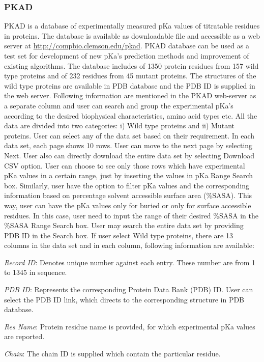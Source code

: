 \documentclass[9pt,tutorial,pubversion]{livecoms}
\begin{document}
\subsubsection{PKAD}
PKAD is a database of experimentally measured pKa values of titratable residues in proteins. The database\cite{pahari2019pkad} is available as downloadable file and accessible as a web server at \url{http://compbio.clemson.edu/pkad}. PKAD database can be used as a test set for development of new pKa’s prediction methods and improvement of existing algorithms. The database includes of 1350 protein residues from 157 wild type proteins and of 232 residues from 45 mutant proteins. The structures of the wild type proteins are available in PDB database and the PDB ID is supplied in the web server. Following information are mentioned in the PKAD web-server as a separate column and user can search and group the experimental pKa’s according to the desired biophysical characteristics, amino acid types etc. All the data are divided into two categories: i) Wild type proteins and ii) Mutant proteins. User can select any of the data set based on their requirement. In each data set, each page shows 10 rows. User can move to the next page by selecting Next. User also can directly download the entire data set by selecting Download CSV option. User can choose to see only those rows which have experimental pKa values in a certain range, just by inserting the values in pKa Range Search box. Similarly, user have the option to filter pKa values and the corresponding information based on percentage solvent accessible surface area (\%SASA). This way, user can have the pKa values only for buried or only for surface accessible residues. In this case, user need to input the range of their desired \%SASA in the \%SASA Range Search box. User may search the entire data set by providing PDB ID in the Search box. If user select Wild type proteins, there are 13 columns in the data set and in each column, following information are available:

\textit{Record ID}: Denotes unique number against each entry. These number are from 1 to 1345 in sequence.

\textit{PDB ID}: Represents the corresponding Protein Data Bank (PDB) ID. User can select the PDB ID link, which directs to the corresponding structure in PDB database. 

\textit{Res Name}: Protein residue name is provided, for which experimental pKa values are reported.

\textit{Chain}: The chain ID is supplied which contain the particular residue.
\end{document}
